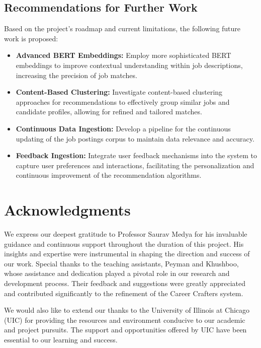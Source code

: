 \documentclass[a4paper,10pt]{article}
\begin{document}
\subsection{Recommendations for Further Work}
Based on the project's roadmap and current limitations, the following future work is proposed:
\begin{itemize}
  \item \textbf{Advanced BERT Embeddings:} Employ more sophisticated BERT embeddings to improve contextual understanding within job descriptions, increasing the precision of job matches.
  \item \textbf{Content-Based Clustering:} Investigate content-based clustering approaches for recommendations to effectively group similar jobs and candidate profiles, allowing for refined and tailored matches.
  \item \textbf{Continuous Data Ingestion:} Develop a pipeline for the continuous updating of the job postings corpus to maintain data relevance and accuracy.
  \item \textbf{Feedback Ingestion:} Integrate user feedback mechanisms into the system to capture user preferences and interactions, facilitating the personalization and continuous improvement of the recommendation algorithms.
\end{itemize}

\section*{Acknowledgments}

We express our deepest gratitude to Professor Saurav Medya for his invaluable guidance and continuous support throughout the duration of this project. His insights and expertise were instrumental in shaping the direction and success of our work. Special thanks to the teaching assistants, Peyman and Khushboo, whose assistance and dedication played a pivotal role in our research and development process. Their feedback and suggestions were greatly appreciated and contributed significantly to the refinement of the Career Crafters system.

We would also like to extend our thanks to the University of Illinois at Chicago (UIC) for providing the resources and environment conducive to our academic and project pursuits. The support and opportunities offered by UIC have been essential to our learning and success.
\end{document}
